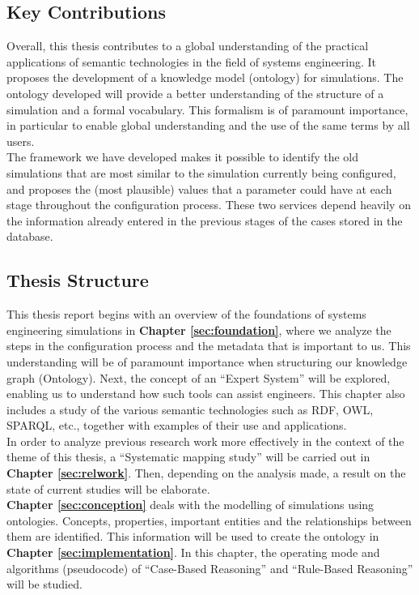 \subsection{Key Contributions}
Overall, this thesis contributes to a global understanding of the practical applications of semantic technologies in the field of systems engineering. It proposes the development of a knowledge model (ontology) for simulations. The ontology developed will provide a better understanding of the structure of a simulation and a formal vocabulary. This formalism is of paramount importance, in particular to enable global understanding and the use of the same terms by all users.\\

The framework we have developed makes it possible to identify the old simulations that are most similar to the simulation currently being configured, and proposes the (most plausible) values that a parameter could have at each stage throughout the configuration process. These two services depend heavily on the information already entered in the previous stages of the cases stored in the database.


\subsection{Thesis Structure}
This thesis report begins with an overview of the foundations of systems engineering simulations in \textbf{Chapter \ref{sec:foundation}}, where we analyze the steps in the configuration process and the metadata that is important to us. This understanding will be of paramount importance when structuring our knowledge graph (Ontology). Next, the concept of an “Expert System” will be explored, enabling us to understand how such tools can assist engineers. This chapter also includes a study of the various semantic technologies such as RDF, OWL, SPARQL, etc., together with examples of their use and applications. \\

In order to analyze previous research work more effectively in the context of the theme of this thesis, a “Systematic mapping study” will be carried out in \textbf{Chapter \ref{sec:relwork}}. Then, depending on the analysis made, a result on the state of current studies will be elaborate.\\

\textbf{Chapter \ref{sec:conception}} deals with the modelling of simulations using ontologies. Concepts, properties, important entities and the relationships between them are identified. This information will be used to create the ontology in \textbf{Chapter \ref{sec:implementation}}. In this chapter, the operating mode and algorithms (pseudocode) of “Case-Based Reasoning” and “Rule-Based Reasoning” will be studied. \\

